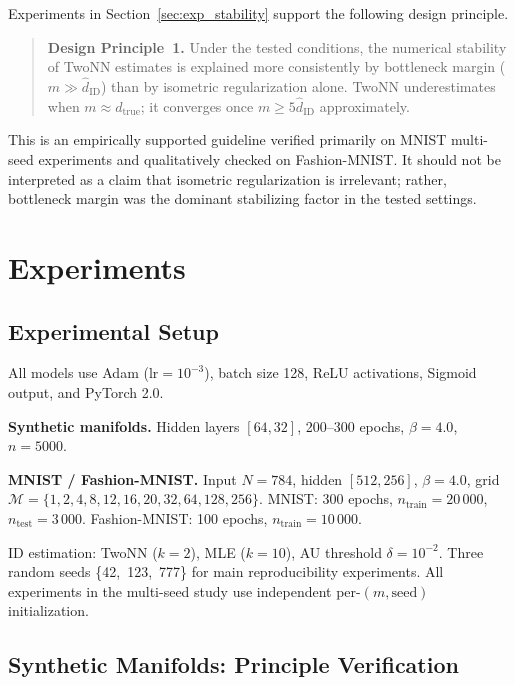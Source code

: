 \documentclass[make,article,submit,pdftex,moreauthors]{Definitions/mdpi}
\newcommand{\hatdID}{\hat{d}_{\mathrm{ID}}}
\begin{document}
Experiments in Section~\ref{sec:exp_stability} support the following design principle.

\begin{quote}
\textbf{Design Principle~1.}
Under the tested conditions, the numerical stability of TwoNN estimates is
explained more consistently by bottleneck margin ($m\gg\hatdID$) than by
isometric regularization alone.
TwoNN underestimates when $m\approx d_{\mathrm{true}}$; it converges once
$m\geq5\hatdID$ approximately.
\end{quote}

This is an empirically supported guideline verified primarily on MNIST
multi-seed experiments and qualitatively checked on Fashion-MNIST.
It should not be interpreted as a claim that isometric regularization is
irrelevant; rather, bottleneck margin was the dominant stabilizing factor in
the tested settings.

\section{Experiments}\label{sec:exp}

\subsection{Experimental Setup}\label{sec:exp_setup}

All models use Adam (lr$=10^{-3}$), batch size 128, ReLU activations,
Sigmoid output, and PyTorch 2.0.

\textbf{Synthetic manifolds.} Hidden layers $[64,32]$, 200--300 epochs,
$\beta=4.0$, $n=5000$.

\textbf{MNIST / Fashion-MNIST.} Input $N=784$, hidden $[512,256]$, $\beta=4.0$,
grid $\mathcal{M}=\{1,2,4,8,12,16,20,32,64,128,256\}$.
MNIST: 300 epochs, $n_{\mathrm{train}}=20\,000$, $n_{\mathrm{test}}=3\,000$.
Fashion-MNIST: 100 epochs, $n_{\mathrm{train}}=10\,000$.

ID estimation: TwoNN ($k=2$), MLE ($k=10$), AU threshold $\delta=10^{-2}$.
Three random seeds \{42,~123,~777\} for main reproducibility experiments.
All experiments in the multi-seed study use independent per-$(m,\text{seed})$
initialization.

\subsection{Synthetic Manifolds: Principle Verification}\label{sec:exp_synthetic}
\end{document}
